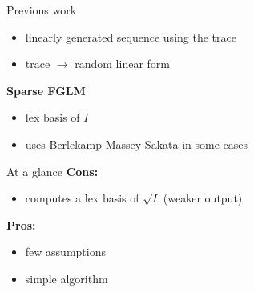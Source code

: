 \documentclass[final]{beamer}
\newlength{\sepwid}
\newlength{\onecolwid}
\newlength{\twocolwid}
\begin{document}
\begin{frame}[t]
\begin{columns}[t]
\begin{column}{\onecolwid}
\begin{alertblock}{{\sf Previous work}}
{}
\begin{itemize}
\item  {\sf linearly generated sequence using the trace}
\end{itemize}

{\sf [Bostan {\it et al.}'03]}
\begin{itemize}
\item {\sf  trace $\to$ random linear form}
\end{itemize}

{}  {\bf Sparse FGLM}
\begin{itemize}
\item {\sf lex basis of $I$}
\item {\sf uses Berlekamp-Massey-Sakata in some cases}
\end{itemize}
\end{alertblock}


\begin{alertblock}{{\sf At a glance}}
{\bf  Cons:}
\begin{itemize}
\item {\sf computes a lex basis of $\sqrt{I}$ (weaker output)}
\end{itemize}
{\bf Pros:}
\begin{itemize}
\item {\sf few assumptions}
\item {\sf simple algorithm}
\end{itemize}
\end{alertblock}

\end{column} %



\begin{column}{\sepwid}\end{column} %

\begin{column}{\twocolwid} %


\end{column}
\end{columns}
\end{frame}
\end{document}
